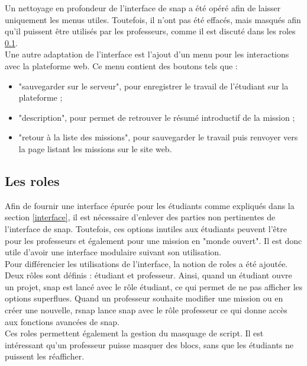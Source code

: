 Un nettoyage en profondeur de l'interface de \gls{snap} a été opéré afin de laisser uniquement les menus utiles. Toutefois, il n'ont pas été effacés, mais masqués afin qu'il puissent être utilisés par les professeurs, comme il est discuté dans les \glspl{role} \ref{role}.\\

Une autre adaptation de l'interface est l'ajout d'un menu pour les interactions avec la plateforme web. Ce menu contient des boutons tels que : 
\begin{itemize}
  \item "sauvegarder sur le serveur", pour enregistrer le travail de l'étudiant sur la plateforme ; 
  \item "description", pour permet de retrouver le résumé introductif de la \gls{mission} ; 
  \item "retour à la liste des \glspl{mission}", pour sauvegarder le travail puis renvoyer vers la page listant les missions sur le site web.
\end{itemize}

\subsection{Les \glspl{role}}
\label{role}

Afin de fournir une interface épurée pour les étudiants comme expliqués dans la section \ref{interface}, il est nécessaire d'enlever des parties non pertinentes de l'interface de \gls{snap}. Toutefois, ces options inutiles aux étudiants peuvent l'être pour les professeurs et également pour une mission en "monde ouvert". Il est donc utile d'avoir une interface modulaire suivant son utilisation. \\

Pour différencier les utilisations de l'interface, la notion de \glspl{role} a été ajoutée. Deux rôles sont définis : étudiant et professeur. Ainsi, quand un étudiant ouvre un projet, \gls{snap} est lancé avec le rôle étudiant, ce qui permet de ne pas afficher les options superflues. Quand un professeur souhaite modifier une mission ou en créer une nouvelle, \gls{rsnap} lance \gls{snap} avec le rôle professeur ce qui donne accès aux fonctions avancées de \gls{snap}.\\

Ces \glspl{role} permettent également la gestion du masquage de script. Il est intéressant qu'un professeur puisse masquer des \glspl{bloc}, sans que les étudiants ne puissent les réafficher.


